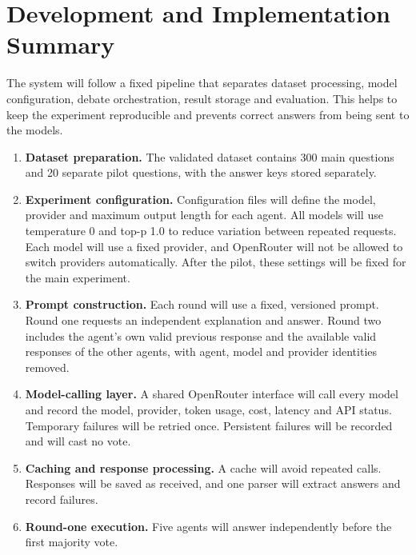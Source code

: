 \documentclass[12pt,a4paper]{article}
\begin{document}
\section{Development and Implementation Summary}
\label{sec:implementation}

The system will follow a fixed pipeline that separates dataset processing,
model configuration, debate orchestration, result storage and evaluation. This
helps to keep the experiment reproducible and prevents correct answers from
being sent to the models.

\begin{enumerate}

    \item \textbf{Dataset preparation.}
    The validated dataset contains 300 main questions and 20 separate pilot
    questions, with the answer keys stored separately.

    \item \textbf{Experiment configuration.}
    Configuration files will define the model, provider and maximum output length for each agent. All models will use temperature 0 and top-p 1.0 to reduce variation between repeated requests. Each model will use a fixed provider, and OpenRouter will not be allowed to switch providers automatically. After the pilot, these settings will be fixed for the main experiment.

    \item \textbf{Prompt construction.}
    Each round will use a fixed, versioned prompt. Round one requests an
    independent explanation and answer. Round two includes the agent's own valid
    previous response and the available valid responses of the other agents,
    with agent, model and provider identities removed.

    \item \textbf{Model-calling layer.}
    A shared OpenRouter interface will call every model and record the model,
    provider, token usage, cost, latency and API status. Temporary failures will
    be retried once. Persistent failures will be recorded and will cast no vote.

    \item \textbf{Caching and response processing.}
    A cache will avoid repeated calls. Responses will be saved as received, and
    one parser will extract answers and record failures.

    \item \textbf{Round-one execution.}
    Five agents will answer independently before the first majority vote.


\end{enumerate}
\end{document}
